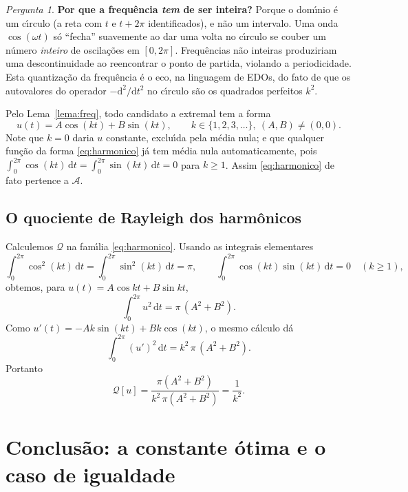 \documentclass[11pt,a4paper]{amsart}
\renewcommand{\d}{\mathrm{d}}
\newcommand{\Q}{\mathcal{Q}}
\newcommand{\Adm}{\mathcal{A}}
\theoremstyle{plain}
\theoremstyle{definition}
\theoremstyle{remark}
\newtheorem{pergunta}[teorema]{Pergunta}
\begin{document}
\begin{pergunta}\label{perg:inteira}
\textbf{Por que a frequ\^encia \emph{tem} de ser inteira?}
Porque o dom\'\i nio \'e um c\'\i rculo (a reta com $t$ e $t+2\pi$
identificados), e n\~ao um intervalo. Uma onda $\cos(\omega t)$ s\'o ``fecha''
suavemente ao dar uma volta no c\'\i rculo se couber um n\'umero \emph{inteiro}
de oscila\c{c}\~oes em $[0,2\pi]$. Frequ\^encias n\~ao inteiras produziriam uma
descontinuidade ao reencontrar o ponto de partida, violando a periodicidade.
Esta quantiza\c{c}\~ao da frequ\^encia \'e o eco, na linguagem de EDOs, do fato
de que os autovalores do operador $-\d^2/\d t^2$ no c\'\i rculo s\~ao os
quadrados perfeitos $k^2$.
\end{pergunta}

Pelo Lema~\ref{lema:freq}, todo candidato a extremal tem a forma
\begin{equation}\label{eq:harmonico}
  u(t) = A\cos(kt) + B\sin(kt),
  \qquad k\in\{1,2,3,\dots\},\ (A,B)\neq(0,0) .
\end{equation}
Note que $k=0$ daria $u$ constante, exclu\'\i da pela m\'edia nula; e que
qualquer fun\c{c}\~ao da forma \eqref{eq:harmonico} j\'a tem m\'edia nula
automaticamente, pois $\int_0^{2\pi}\cos(kt)\,\d t = \int_0^{2\pi}\sin(kt)\,\d
t = 0$ para $k\ge 1$. Assim \eqref{eq:harmonico} de fato pertence a $\Adm$.

\subsection{O quociente de Rayleigh dos harm\^onicos}

Calculemos $\Q$ na fam\'\i lia \eqref{eq:harmonico}. Usando as integrais
elementares
\[
  \int_0^{2\pi}\cos^2(kt)\,\d t = \int_0^{2\pi}\sin^2(kt)\,\d t = \pi,
  \qquad
  \int_0^{2\pi}\cos(kt)\sin(kt)\,\d t = 0
  \quad (k\ge 1),
\]
obtemos, para $u(t)=A\cos kt + B\sin kt$,
\[
  \int_0^{2\pi} u^2 \,\d t = \pi\,(A^2+B^2) .
\]
Como $u'(t) = -Ak\sin(kt) + Bk\cos(kt)$, o mesmo c\'alculo d\'a
\[
  \int_0^{2\pi} (u')^2 \,\d t = k^2\,\pi\,(A^2+B^2) .
\]
Portanto
\begin{equation}\label{eq:Q-harmonico}
  \Q[u] = \frac{\pi(A^2+B^2)}{k^2\,\pi(A^2+B^2)} = \frac{1}{k^2} .
\end{equation}

\section{Conclus\~ao: a constante \'otima e o caso de igualdade}
\label{sec:conclusao}
\end{document}
